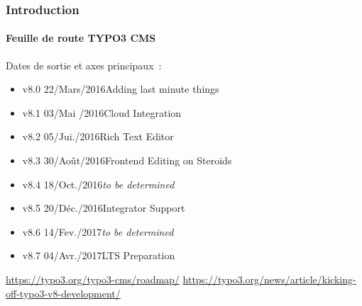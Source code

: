 \begin{frame}[fragile]
	\frametitle{Introduction}
	\framesubtitle{Feuille de route TYPO3 CMS}

	Dates de sortie et axes principaux~:

	\begin{itemize}

		\item
			\begingroup
				\color{typo3orange}
					v8.0 \tabto{1.1cm}22/Mars/2016\tabto{3.4cm}Adding last minute things
			\endgroup
		\item v8.1 \tabto{1.1cm}03/Mai /2016\tabto{3.4cm}Cloud Integration
		\item v8.2 \tabto{1.1cm}05/Jui./2016\tabto{3.4cm}Rich Text Editor
		\item v8.3 \tabto{1.1cm}30/Août/2016\tabto{3.4cm}Frontend Editing on Steroids
		\item v8.4 \tabto{1.1cm}18/Oct./2016\tabto{3.4cm}\textit{to be determined}
		\item v8.5 \tabto{1.1cm}20/Déc./2016\tabto{3.4cm}Integrator Support
		\item v8.6 \tabto{1.1cm}14/Fev./2017\tabto{3.4cm}\textit{to be determined}
		\item v8.7 \tabto{1.1cm}04/Avr./2017\tabto{3.4cm}LTS Preparation

	\end{itemize}

	\smaller
		\url{https://typo3.org/typo3-cms/roadmap/}\newline
		\url{https://typo3.org/news/article/kicking-off-typo3-v8-development/}
	\normalsize

\end{frame}

